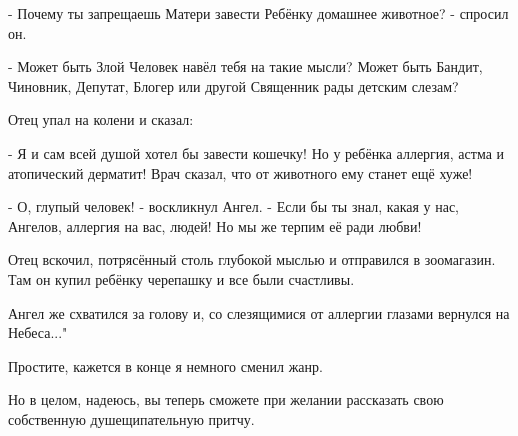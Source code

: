 - Почему ты запрещаешь Матери завести Ребёнку домашнее животное? - спросил он.

- Может быть Злой Человек навёл тебя на такие мысли? Может быть Бандит,
Чиновник, Депутат, Блогер или другой Священник рады детским слезам?

Отец упал на колени и сказал:

- Я и сам всей душой хотел бы завести кошечку! Но у ребёнка аллергия, астма и
атопический дерматит! Врач сказал, что от животного ему станет ещё хуже!

- О, глупый человек! - воскликнул Ангел. - Если бы ты знал, какая у нас,
Ангелов, аллергия на вас, людей! Но мы же терпим её ради любви!

Отец вскочил, потрясённый столь глубокой мыслью и отправился в зоомагазин. Там
он купил ребёнку черепашку и все были счастливы.

Ангел же схватился за голову и, со слезящимися от аллергии глазами вернулся на
Небеса..."

Простите, кажется в конце я немного сменил жанр.

Но в целом, надеюсь, вы теперь сможете при желании рассказать свою собственную
душещипательную притчу.


